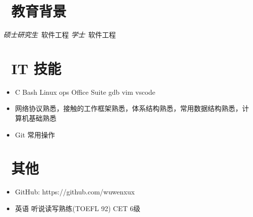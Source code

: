 \documentclass{resume}
\begin{document}
\section{\faGraduationCap\  教育背景}
\textit{硕士研究生}\ 软件工程
\textit{学士}\ 软件工程

\section{\faCogs\ IT 技能}
\begin{itemize}[parsep=0.5ex]
  \item C Bash Linux ops Office Suite gdb vim vscode
  \item 网络协议熟悉，接触的工作框架熟悉，体系结构熟悉，常用数据结构熟悉，计算机基础熟悉
  \item Git 常用操作 
\end{itemize}

\section{\faInfo\ 其他}
\begin{itemize}[parsep=0.5ex]
  \item GitHub: https://github.com/wuwenxux
  \item 英语  听说读写熟练(TOEFL 92) CET 6级
\end{itemize}

%
%
\end{document}
